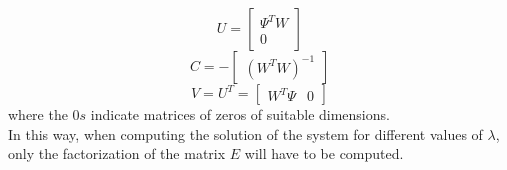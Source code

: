 \begin{equation*}
    U = 
    \begin{bmatrix}
        \Psi^TW\\
        0
    \end{bmatrix}
\end{equation*}
\begin{equation*}
    C = -
    \begin{bmatrix}
        (W^TW)^{-1}
    \end{bmatrix}
\end{equation*}
\begin{equation*}
    V = U^T =
    \begin{bmatrix}
        W^T\Psi & 0
    \end{bmatrix}
\end{equation*}
where the $0s$ indicate matrices of zeros of suitable dimensions.\\
In this way, when computing the solution of the system for different values of $\lambda$, only the factorization of the matrix $E$ will have to be computed.